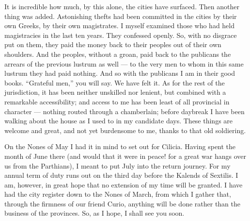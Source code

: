 It is incredible how much, by this alone, the cities have surfaced. Then another thing was added. Astonishing thefts had been committed in the cities by their own Greeks, by their own magistrates. I myself examined those who had held magistracies in the last ten years. They confessed openly. So, with no disgrace put on them, they paid the money back to their peoples out of their own shoulders. And the peoples, without a groan, paid back to the publicans the arrears of the previous lustrum as well --- to the very men to whom in this same lustrum they had paid nothing. And so with the publicans I am in their good books. ``Grateful men,'' you will say. We have felt it. As for the rest of the jurisdiction, it has been neither unskilled nor lenient, but combined with a remarkable accessibility; and access to me has been least of all provincial in character --- nothing routed through a chamberlain; before daybreak I have been walking about the house as I used to in my candidate days. These things are welcome and great, and not yet burdensome to me, thanks to that old soldiering.

 On the Nones of May I had it in mind to set out for Cilicia. Having spent the month of June there (and would that it were in peace! for a great war hangs over us from the Parthians), I meant to put July into the return journey. For my annual term of duty runs out on the third day before the Kalends of Sextilis. I am, however, in great hope that no extension of my time will be granted. I have had the city register down to the Nones of March, from which I gather that, through the firmness of our friend Curio, anything will be done rather than the business of the provinces. So, as I hope, I shall see you soon.

